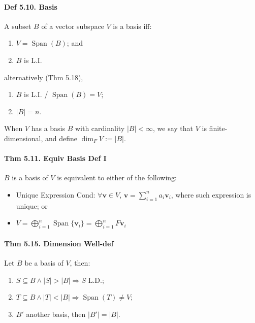 \paragraph{Def 5.10. Basis} A subset $B$ of a vector subspace $V$ is a basis iff:
\begin{enumerate}
    \item $V = \operatorname{Span}(B)$; and
    \item $B$ is L.I.
\end{enumerate}

alternatively (Thm 5.18), 

\begin{enumerate}
    \item $B$ is L.I. / $\operatorname{Span}(B)=V$;
    \item $|B| = n$.
\end{enumerate}

When $V$ has a basis $B$ with cardinality $|B| < \infty$, we say that $V$ is finite-dimensional, and define $\operatorname{dim}_FV:=|B|$.

\paragraph{Thm 5.11. Equiv Basis Def I} $B$ is a basis of $V$ is equivalent to either of the following:

\begin{itemize}[noitemsep,nolistsep]
    \item Unique Expression Cond: $\forall \mathbf{v}\in V$, $\mathbf{v}=\sum_{i=1}^{n}a_i\mathbf{v}_i$, where such expression is unique; or
    \item $V = \bigoplus_{i=1}^{n}\operatorname{Span}\{\mathbf{v}_i\} = \bigoplus_{i=1}^{n}F\mathbf{v}_i$
\end{itemize}

\paragraph{Thm 5.15. Dimension Well-def} Let $B$ be a basis of $V$, then:
\begin{enumerate}
    \item $S\subseteq B \land |S|>|B| \Rightarrow S\text{ L.D.}$;
    \item $T \subseteq B \land |T|<|B| \Rightarrow \operatorname{Span}(T)\neq V$;
    \item $B'$ another basis, then $|B'| = |B|$.
\end{enumerate}

